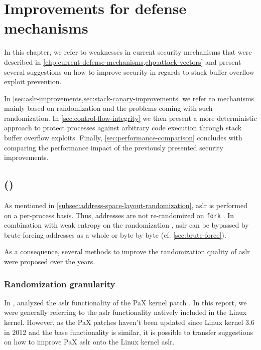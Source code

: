 \chapter{Improvements for defense mechanisms}
\label{chp:defense-mechanism-improvements}

In this chapter, we refer to weaknesses in current security mechanisms that were described in \cref{chp:current-defense-mechanisms,chp:attack-vectors} and present several suggestions on how to improve security in regards to stack buffer overflow exploit prevention.

In \cref{sec:aslr-improvements,sec:stack-canary-improvements} we refer to mechanisms mainly based on randomization and the problems coming with such randomization.
In \cref{sec:control-flow-integrity} we then present a more deterministic approach to protect processes against arbitrary code execution through stack buffer overflow exploits.
Finally, \cref{sec:performance-comparison} concludes with comparing the performance impact of the previously presented security improvements.

\section{ ()}
\label{sec:aslr-improvements}

As mentioned in \cref{subsec:address-space-layout-randomization}, \gls{aslr} is performed on a per-process basis.
Thus, addresses are not re-randomized on \texttt{fork} \cite[1\psq]{Lu2016}.
In combination with weak entropy on the randomization \cites{MarcoGisbert2014}[3\psqq]{MarcoGisbert2016}, \gls{aslr} can be bypassed by brute-forcing addresses as a whole or byte by byte (cf. \cref{sec:brute-force}).

As a consequence, several methods to improve the randomization quality of \gls{aslr} were proposed over the years.

\subsection{Randomization granularity}
\label{subsec:randomization-granularity}

In \citeyear{Shacham2004}, \citeauthor{Shacham2004} analyzed the \gls{aslr} functionality of the PaX kernel patch \cite{Shacham2004}.
In this report, we were generally referring to the \gls{aslr} functionality natively included in the Linux kernel.
However, as the PaX patches haven't been updated since Linux kernel 3.6 in 2012 \cite{PaXTeam} and the base functionality is similar, it is possible to transfer suggestions on how to improve PaX \gls{aslr} onto the Linux kernel \gls{aslr}.

